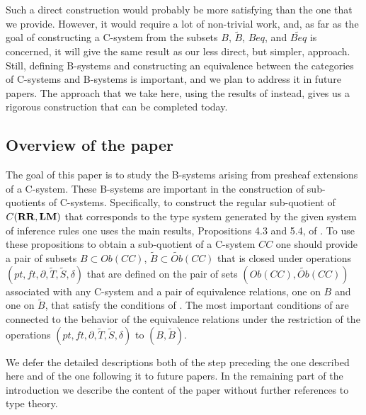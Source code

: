 \documentclass[onecolumn,12pt]{amsart}
\newcommand{\DG}[1]{}
\renewcommand{\DG}[1]{\todo[color=green!30]{DG: #1}\PackageWarning{TODO}{DG: #1}}
\numberwithin{proposition}{subsection}
\newcommand{\wt}{\widetilde}
\newcommand{\RR}{{\bf RR}}
\newcommand{\LM}{{\bf LM}}
\begin{document}
Such a direct construction would probably be more satisfying than the one that
we provide. However, it would require a lot of non-trivial work, and, as far as
the goal of constructing a C-system from the subsets $B$, $\wt{B}$, $Beq$, and
$\wt{Beq}$ is concerned, it will give the same result as our less direct, but simpler,
approach. Still, defining B-systems and constructing an equivalence between the
categories of C-systems and B-systems is important, and we plan to address it in
future papers. The approach that we take here, using the results of
\cite{Csubsystems} instead, gives us a rigorous construction that can be
completed today.



\subsection{Overview of the paper}
\label{sec:overview-paper}

The goal of this paper is to study the B-systems arising from presheaf extensions of a C-system.
These B-systems are important in the construction of sub-quotients of C-systems.
Specifically, to construct the regular sub-quotient of $C(\RR,\LM)$ that corresponds to the
type system generated by the given system of inference rules one uses the main
results, Propositions 4.3 and 5.4, of \cite{Csubsystems}. To use these
propositions to obtain a sub-quotient of a C-system $CC$ one should provide a
pair of subsets $B\subset Ob(CC)$, $\wt{B}\subset \wt{Ob}(CC)$ that is closed
under operations $(pt,ft,\partial,\wt{T},\wt{S},\delta)$ that are defined on
the pair of sets $(Ob(CC),\wt{Ob}(CC))$ associated with any C-system
\cite[Prop. 4.3]{Csubsystems} and a pair of equivalence relations, one on $B$ and one on $\wt B$,
that satisfy the conditions of \cite[Prop. 5.4]{Csubsystems}. The
most important conditions of \cite[Prop. 5.4]{Csubsystems} are connected to the
behavior of the equivalence relations under the restriction of the operations
$(pt,ft,\partial,\wt{T},\wt{S},\delta)$ to $(B,\wt{B})$.

We defer the detailed descriptions both of the step preceding the one described
here and of the one following it to future papers. In the remaining part of the
introduction we describe the content of the paper without further references to
type theory.
\end{document}
